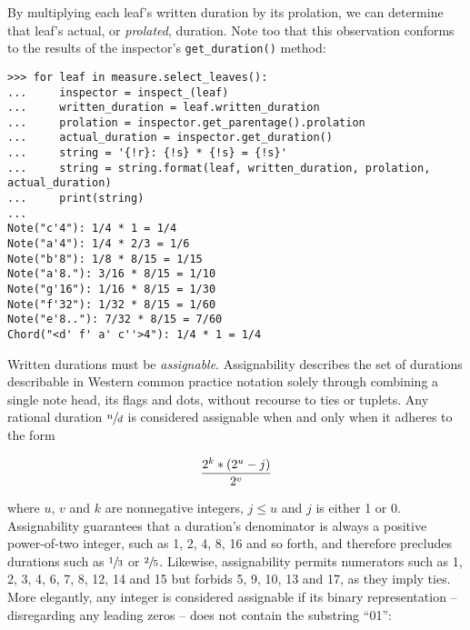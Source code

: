 \noindent By multiplying each leaf's written duration by its prolation, we can
determine that leaf's actual, or \emph{prolated}, duration. Note too that this
observation conforms to the results of the inspector's \texttt{get\_duration()}
method:

\begin{comment}
<abjad>
for leaf in measure.select_leaves():
    inspector = inspect_(leaf)
    written_duration = leaf.written_duration
    prolation = inspector.get_parentage().prolation
    actual_duration = inspector.get_duration()
    string = '{!r}: {!s} * {!s} = {!s}'
    string = string.format(leaf, written_duration, prolation, actual_duration)
    print(string)

</abjad>
\end{comment}

\begin{abjadbookoutput}
\begin{singlespacing}
\vspace{-0.5\baselineskip}
\begin{verbatim}
>>> for leaf in measure.select_leaves():
...     inspector = inspect_(leaf)
...     written_duration = leaf.written_duration
...     prolation = inspector.get_parentage().prolation
...     actual_duration = inspector.get_duration()
...     string = '{!r}: {!s} * {!s} = {!s}'
...     string = string.format(leaf, written_duration, prolation, actual_duration)
...     print(string)
...
Note("c'4"): 1/4 * 1 = 1/4
Note("a'4"): 1/4 * 2/3 = 1/6
Note("b'8"): 1/8 * 8/15 = 1/15
Note("a'8."): 3/16 * 8/15 = 1/10
Note("g'16"): 1/16 * 8/15 = 1/30
Note("f'32"): 1/32 * 8/15 = 1/60
Note("e'8.."): 7/32 * 8/15 = 7/60
Chord("<d' f' a' c''>4"): 1/4 * 1 = 1/4
\end{verbatim}
\end{singlespacing}
\end{abjadbookoutput}

\noindent Written durations must be \emph{assignable}. Assignability describes
the set of durations describable in Western common practice notation solely
through combining a single note head, its flags and dots, without recourse to
ties or tuplets. Any rational duration $\sfrac{n}{d}$ is considered assignable
when and only when it adheres to the form

\begin{equation}
{ 2^k * (2^u - j) \over 2^v }
\end{equation}

\noindent where $u$, $v$ and $k$ are nonnegative integers, $j \leq u$ and $j$
is either 1 or 0. Assignability guarantees that a duration's denominator is
always a positive power-of-two integer, such as 1, 2, 4, 8, 16 and so forth,
and therefore precludes durations such as $\sfrac{1}{3}$ or $\sfrac{2}{5}$.
Likewise, assignability permits numerators such as 1, 2, 3, 4, 6, 7, 8, 12, 14
and 15 but forbids 5, 9, 10, 13 and 17, as they imply ties. More elegantly, any
integer is considered assignable if its binary representation -- disregarding
any leading zeros -- does not contain the substring \enquote{01}:

